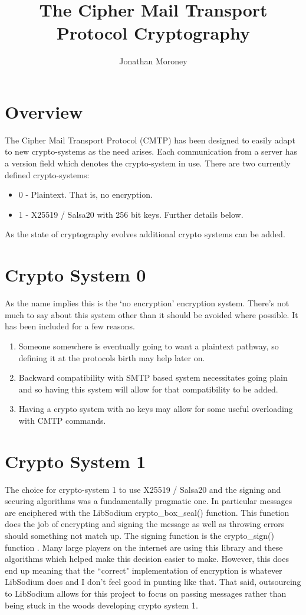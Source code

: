 \documentclass[a4paper,11pt]{article}
\title{The Cipher Mail Transport Protocol Cryptography}
\author{Jonathan Moroney}
\begin{document}
\maketitle


\section{Overview}
The Cipher Mail Transport Protocol (CMTP) has been designed to easily adapt to new crypto-systems as the need arises. Each communication from a server has a version field which denotes the crypto-system in use. There are two currently defined crypto-systems:
\begin{itemize}
  \item 0 - Plaintext. That is, no encryption.
  \item 1 - X25519 / Salsa20 with 256 bit keys. Further details below.
\end{itemize}
As the state of cryptography evolves additional crypto systems can be added.
\section{Crypto System 0}
As the name implies this is the `no encryption' encryption system. There's not much to say about this system other than it should be avoided where possible. It has been included for a few reasons.
\begin{enumerate}
  \item Someone somewhere is eventually going to want a plaintext pathway, so defining it at the protocols birth may help later on.
  \item Backward compatibility with SMTP based system necessitates going plain and so having this system will allow for that compatibility to be added.
  \item Having a crypto system with no keys may allow for some useful overloading with CMTP commands.
\end{enumerate}
\section{Crypto System 1}
The choice for crypto-system 1 to use X25519 / Salsa20 and the signing and securing algorithms was a fundamentally pragmatic one. In particular messages are enciphered with the LibSodium crypto\_box\_seal() \cite{crypto-box-seal} function. This function does the job of encrypting and signing the message as well as throwing errors should something not match up. The signing function is the crypto\_sign() function \cite{crypto-sign}. Many large players on the internet are using this library and these algorithms which helped make this decision easier to make. However, this does end up meaning that the ``correct" implementation of encryption is whatever LibSodium does and I don't feel good in punting like that. That said, outsourcing to LibSodium allows for this project to focus on passing messages rather than being stuck in the woods developing crypto system 1.



\end{document}

